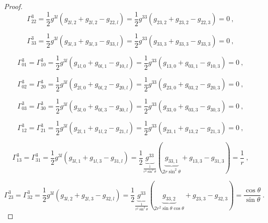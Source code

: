 \begin{proof}
        \begin{equation*}
            \Gamma^3_{22} = \frac{1}{2} g^{3l} (g_{2l,2} + g_{2l,2} - g_{22,l}) = \frac{1}{2} g^{33} (g_{23,2} + g_{23,2} - g_{22,3}) = 0 ~,
        \end{equation*}

        \begin{equation*}
            \Gamma^3_{33} = \frac{1}{2} g^{3l} (g_{3l,3} + g_{3l,3} - g_{33,l}) = \frac{1}{2} g^{33} (g_{33,3} + g_{33,3} - g_{33,3}) = 0 ~,
        \end{equation*}

        \begin{equation*}
            \Gamma^3_{01} = \Gamma^3_{10} = \frac{1}{2} g^{3l} (g_{1l,0} + g_{0l,1} - g_{10,l}) = \frac{1}{2} g^{33} (g_{13,0} + g_{03,1} - g_{10,3}) = 0 ~,
        \end{equation*}

        \begin{equation*}
            \Gamma^3_{02} = \Gamma^3_{20} = \frac{1}{2} g^{3l} (g_{2l,0} + g_{0l,2} - g_{20,l}) = \frac{1}{2} g^{33} (g_{23,0} + g_{03,2} - g_{20,3}) = 0 ~, 
        \end{equation*}

        \begin{equation*}
            \Gamma^3_{03} = \Gamma^3_{30} = \frac{1}{2} g^{3l} (g_{3l,0} + g_{0l,3} - g_{30,l}) = \frac{1}{2} g^{33} (g_{33,0} + g_{03,3} - g_{30,3}) = 0 ~,
        \end{equation*}

        \begin{equation*}
            \Gamma^3_{12} = \Gamma^3_{21} = \frac{1}{2} g^{3l} (g_{2l,1} + g_{1l,2} - g_{21,l}) = \frac{1}{2} g^{33} (g_{23,1} + g_{13,2} - g_{21,3}) = 0 ~,
        \end{equation*}

        \begin{equation*}
            \Gamma^3_{13} = \Gamma^3_{31} = \frac{1}{2} g^{3l} (g_{3l,1} + g_{1l,3} - g_{31,l}) = \frac{1}{2} \underbrace{g^{33}}_{\frac{1}{r^2 \sin^2 \theta}} (\underbrace{g_{33,1}}_{2 r \sin^2 \theta} + g_{13,3} - g_{31,3}) = \frac{1}{r} ~,
        \end{equation*}

        \begin{equation*}
            \Gamma^3_{23} = \Gamma^3_{32} = \frac{1}{2} g^{3l} (g_{3l,2} + g_{2l,3} - g_{32,l}) = \frac{1}{2} \underbrace{g^{33}}_{\frac{1}{r^2 \sin^2 \theta}} (\underbrace{g_{33,2}}_{2 r^2 \sin \theta \cos \theta} + g_{23,3} - g_{32,3}) = \frac{\cos \theta}{\sin \theta} ~.
        \end{equation*}


\end{proof}
